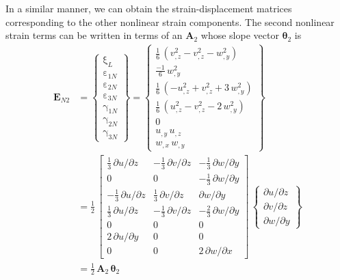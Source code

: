 In a similar manner, we can obtain the strain-displacement matrices corresponding to the other nonlinear strain components. The second nonlinear strain terms can be written in terms of an $\mathbf{A}_2$ whose slope vector $\boldsymbol{\theta}_2$ is
\begin{equation}
\begin{aligned}
\mathbf{E}_{N2} & =  \begin{Bmatrix}
\mathrm \xi_{L} \\
\mathrm \varepsilon_{1N} \\
\mathrm \varepsilon_{2N} \\
\mathrm \varepsilon_{3N} \\
\mathrm \gamma_{1N} \\
\mathrm \gamma_{2N} \\
\mathrm \gamma_{3N} \end{Bmatrix} =
\begin{Bmatrix}
\tfrac{1}{6} \,  \left( v_{,z}^2 - v_{,z}^2 - w_{,y}^2  \right)\\
\tfrac{-1}{6} \, w_{,y}^2 \\
\tfrac{1}{6} \,  \left( - u_{,z}^2  + v_{,z}^2 + 3 \, w_{,y}^2 \right) \\
\tfrac{1}{6} \,  \left( u_{,z}^2  - v_{,z}^2 - 2 \, w_{,y}^2 \right) \\ 
0 \\
u_{,y} \, u_{,z}  \\ 
w_{,x} \, w_{,y} \end{Bmatrix} \\
& = \frac{1}{2} \, \begin{bmatrix}
 \tfrac{1}{3} \, \partial u / \partial z &  - \tfrac{1}{3} \, \partial v / \partial z & - \tfrac{1}{3} \, \partial w / \partial y  \\
0 & 0 & - \tfrac{1}{3} \, \partial w / \partial y  \\
-\tfrac{1}{3} \, \partial u / \partial z  & \tfrac{1}{3} \, \partial v / \partial z & \partial w / \partial y \\
 \tfrac{1}{3} \, \partial u / \partial z & - \tfrac{1}{3} \, \partial v / \partial z & - \tfrac{2}{3} \, \partial w / \partial y   \\
0 & 0 & 0  \\
2 \, \partial u / \partial y &  0 & 0 \\
0 &  0 &  2 \, \partial w / \partial x  \end{bmatrix} \, \begin{Bmatrix}
\partial u / \partial z\\
\partial v / \partial z \\
\partial w / \partial y
\end{Bmatrix} \\
& = \tfrac{1}{2} \, \mathbf{A}_2 \, \boldsymbol{\theta}_2
\end{aligned}
\end{equation}
